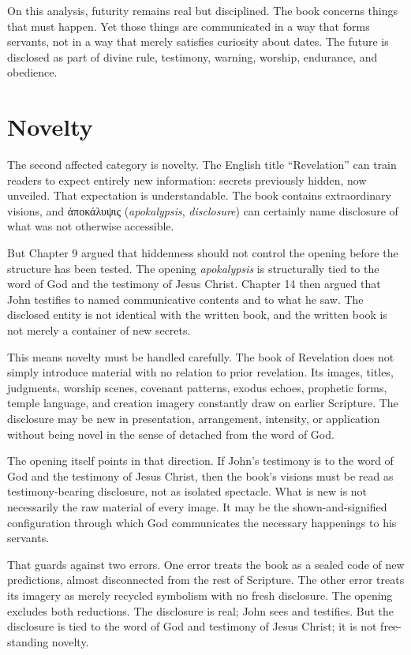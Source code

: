 On this analysis, futurity remains real but disciplined. The book concerns things that must happen. Yet those things are communicated in a way that forms servants, not in a way that merely satisfies curiosity about dates. The future is disclosed as part of divine rule, testimony, warning, worship, endurance, and obedience.

\section{Novelty}

The second affected category is novelty. The English title ``Revelation'' can train readers to expect entirely new information: secrets previously hidden, now unveiled. That expectation is understandable. The book contains extraordinary visions, and \textgreek{ἀποκάλυψις} (\textit{apokalypsis}, \textit{disclosure}) can certainly name disclosure of what was not otherwise accessible.

But Chapter 9 argued that hiddenness should not control the opening before the structure has been tested. The opening \textit{apokalypsis} is structurally tied to the word of God and the testimony of Jesus Christ. Chapter 14 then argued that John testifies to named communicative contents and to what he saw. The disclosed entity is not identical with the written book, and the written book is not merely a container of new secrets.

This means novelty must be handled carefully. The book of Revelation does not simply introduce material with no relation to prior revelation. Its images, titles, judgments, worship scenes, covenant patterns, exodus echoes, prophetic forms, temple language, and creation imagery constantly draw on earlier Scripture. The disclosure may be new in presentation, arrangement, intensity, or application without being novel in the sense of detached from the word of God.

The opening itself points in that direction. If John's testimony is to the word of God and the testimony of Jesus Christ, then the book's visions must be read as testimony-bearing disclosure, not as isolated spectacle. What is new is not necessarily the raw material of every image. It may be the shown-and-signified configuration through which God communicates the necessary happenings to his servants.

That guards against two errors. One error treats the book as a sealed code of new predictions, almost disconnected from the rest of Scripture. The other error treats its imagery as merely recycled symbolism with no fresh disclosure. The opening excludes both reductions. The disclosure is real; John sees and testifies. But the disclosure is tied to the word of God and testimony of Jesus Christ; it is not free-standing novelty.


